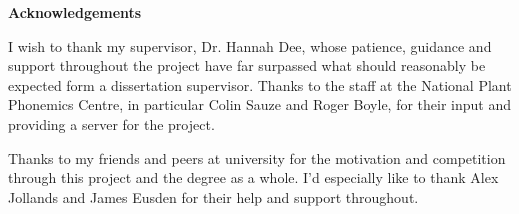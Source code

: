 \thispagestyle{empty}

\begin{center}
    {\LARGE\bf Acknowledgements}
\end{center}

I wish to thank my supervisor, Dr. Hannah Dee, whose patience, guidance and support throughout the project have far surpassed what should reasonably be expected form a dissertation supervisor.
Thanks to the staff at the National Plant Phonemics Centre, in particular Colin Sauze and Roger Boyle, for their input and providing a server for the project. 

Thanks to  my friends and peers at university for the motivation and competition through this project and the degree as a whole. I'd especially like to thank Alex Jollands and James Eusden for their help and support throughout.





